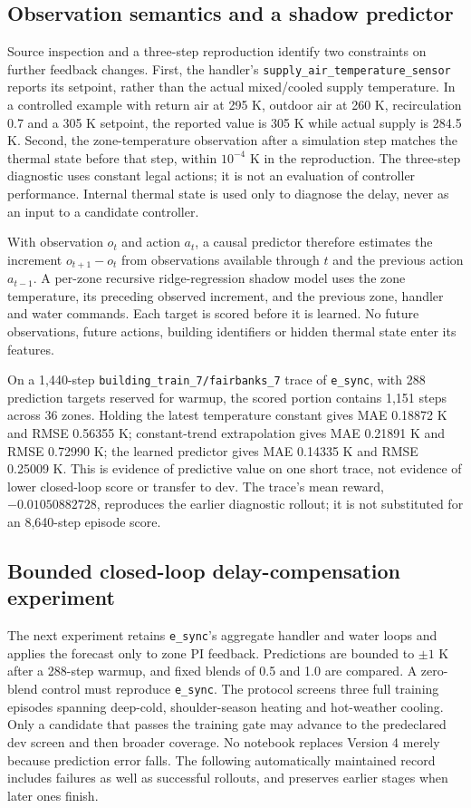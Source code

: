 \subsection{Observation semantics and a shadow predictor}
Source inspection and a three-step reproduction identify two constraints on
further feedback changes. First, the handler's
\texttt{supply\_air\_temperature\_sensor} reports its setpoint, rather than
the actual mixed/cooled supply temperature. In a controlled example with
return air at 295 K, outdoor air at 260 K, recirculation 0.7 and a 305 K
setpoint, the reported value is 305 K while actual supply is 284.5 K.
Second, the zone-temperature observation after a simulation step matches
the thermal state before that step, within $10^{-4}$ K in the reproduction.
The three-step diagnostic uses constant legal actions; it is not an evaluation
of controller performance. Internal thermal state is used only to diagnose
the delay, never as an input to a candidate controller.

With observation $o_t$ and action $a_t$, a causal predictor therefore estimates
the increment $o_{t+1}-o_t$ from observations available through $t$ and the
previous action $a_{t-1}$. A per-zone recursive ridge-regression shadow model
uses the zone temperature, its preceding observed increment, and the previous
zone, handler and water commands. Each target is scored before it is learned.
No future observations, future actions, building identifiers or hidden thermal
state enter its features.

On a 1,440-step \texttt{building\_train\_7/fairbanks\_7} trace of
\texttt{e\_sync}, with 288 prediction targets reserved for warmup, the scored
portion contains 1,151 steps across 36 zones. Holding the latest temperature
constant gives MAE 0.18872 K and RMSE 0.56355 K; constant-trend extrapolation
gives MAE 0.21891 K and RMSE 0.72990 K; the learned predictor gives
MAE 0.14335 K and RMSE 0.25009 K. This is evidence of predictive value on
one short trace, not evidence of lower closed-loop score or transfer to dev.
The trace's mean reward, $-0.01050882728$, reproduces the earlier diagnostic
rollout; it is not substituted for an 8,640-step episode score.

\subsection{Bounded closed-loop delay-compensation experiment}
The next experiment retains \texttt{e\_sync}'s aggregate handler and water
loops and applies the forecast only to zone PI feedback. Predictions are
bounded to $\pm1$ K after a 288-step warmup, and fixed blends of 0.5 and 1.0
are compared. A zero-blend control must reproduce \texttt{e\_sync}.
The protocol screens three full training episodes spanning deep-cold,
shoulder-season heating and hot-weather cooling. Only a candidate that passes
the training gate may advance to the predeclared dev screen and then broader
coverage. No notebook replaces Version 4 merely because prediction error falls.
The following automatically maintained record includes failures as well as
successful rollouts, and preserves earlier stages when later ones finish.


